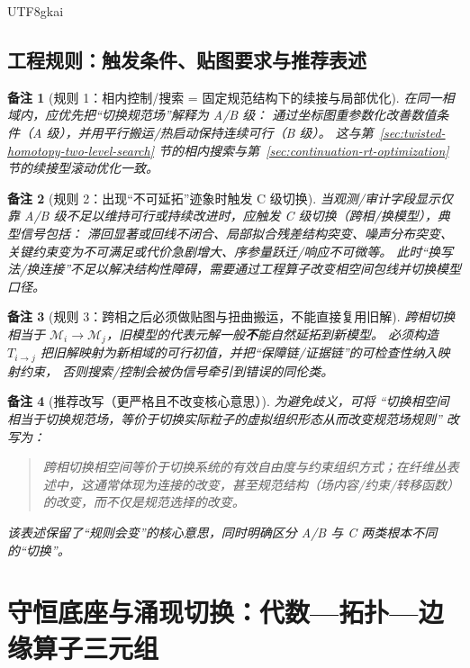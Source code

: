\documentclass[12pt]{article}
\newtheorem{remark}{备注}[section]
\begin{document}
\begin{CJK*}{UTF8}{gkai}
\subsection{工程规则：触发条件、贴图要求与推荐表述}
\label{sec:gauge-switching-engineering-rules}

\begin{remark}[规则 1：相内控制/搜索 = 固定规范结构下的续接与局部优化]
在同一相域内，应优先把“切换规范场”解释为 A/B 级：
通过坐标图重参数化改善数值条件（A 级），并用平行搬运/热启动保持连续可行（B 级）。
这与第~\ref{sec:twisted-homotopy-two-level-search} 节的相内搜索与第~\ref{sec:continuation-rt-optimization} 节的续接型滚动优化一致。
\end{remark}

\begin{remark}[规则 2：出现“不可延拓”迹象时触发 C 级切换]
当观测/审计字段显示仅靠 A/B 级不足以维持可行或持续改进时，应触发 C 级切换（跨相/换模型），典型信号包括：
滞回显著或回线不闭合、局部拟合残差结构突变、噪声分布突变、关键约束变为不可满足或代价急剧增大、序参量跃迁/响应不可微等。
此时“换写法/换连接”不足以解决结构性障碍，需要通过工程算子改变相空间包线并切换模型口径。
\end{remark}

\begin{remark}[规则 3：跨相之后必须做贴图与扭曲搬运，不能直接复用旧解]
跨相切换相当于 $\mathcal{M}_i\to\mathcal{M}_j$，旧模型的代表元解一般\textbf{不}能自然延拓到新模型。
必须构造 $T_{i\to j}$ 把旧解映射为新相域的可行初值，并把“保障链/证据链”的可检查性纳入映射约束，
否则搜索/控制会被伪信号牵引到错误的同伦类。
\end{remark}

\begin{remark}[推荐改写（更严格且不改变核心意思）]
为避免歧义，可将
“切换相空间相当于切换规范场，等价于切换实际粒子的虚拟组织形态从而改变规范场规则”
改写为：
\begin{quote}
跨相切换相空间等价于切换系统的有效自由度与约束组织方式；在纤维丛表述中，这通常体现为连接的改变，甚至规范结构（场内容/约束/转移函数）的改变，而不仅是规范选择的改变。
\end{quote}
该表述保留了“规则会变”的核心意思，同时明确区分 A/B 与 C 两类根本不同的“切换”。
\end{remark}

\section{守恒底座与涌现切换：代数—拓扑—边缘算子三元组}
\label{sec:emergent-switching-algebra-topology-edge}


\end{CJK*}
\end{document}
